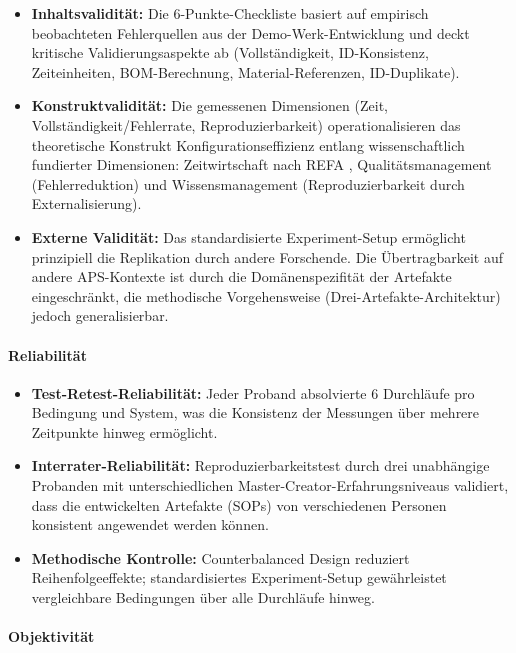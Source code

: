 \begin{itemize}
    \item \textbf{Inhaltsvalidität:} Die 6-Punkte-Checkliste basiert auf empirisch beobachteten Fehlerquellen aus der Demo-Werk-Entwicklung und deckt kritische Validierungsaspekte ab (Vollständigkeit, ID-Konsistenz, Zeiteinheiten, BOM-Berechnung, Material-Referenzen, ID-Duplikate).

    \item \textbf{Konstruktvalidität:} Die gemessenen Dimensionen (Zeit, Vollständigkeit/Fehlerrate, Reproduzierbarkeit) operationalisieren das theoretische Konstrukt \glqq Konfigurationseffizienz\grqq{} entlang wissenschaftlich fundierter Dimensionen: Zeitwirtschaft nach REFA \citep{REFA2012}, Qualitätsmanagement (Fehlerreduktion) und Wissensmanagement (Reproduzierbarkeit durch Externalisierung).

    \item \textbf{Externe Validität:} Das standardisierte Experiment-Setup ermöglicht prinzipiell die Replikation durch andere Forschende. Die Übertragbarkeit auf andere APS-Kontexte ist durch die Domänenspezifität der Artefakte eingeschränkt, die methodische Vorgehensweise (Drei-Artefakte-Architektur) jedoch generalisierbar.
\end{itemize}

\paragraph{Reliabilität}

\begin{itemize}
    \item \textbf{Test-Retest-Reliabilität:} Jeder Proband absolvierte 6 Durchläufe pro Bedingung und System, was die Konsistenz der Messungen über mehrere Zeitpunkte hinweg ermöglicht.

    \item \textbf{Interrater-Reliabilität:} Reproduzierbarkeitstest durch drei unabhängige Probanden mit unterschiedlichen Master-Creator-Erfahrungsniveaus validiert, dass die entwickelten Artefakte (SOPs) von verschiedenen Personen konsistent angewendet werden können.

    \item \textbf{Methodische Kontrolle:} Counterbalanced Design reduziert Reihenfolgeeffekte; standardisiertes Experiment-Setup gewährleistet vergleichbare Bedingungen über alle Durchläufe hinweg.
\end{itemize}

\paragraph{Objektivität}

